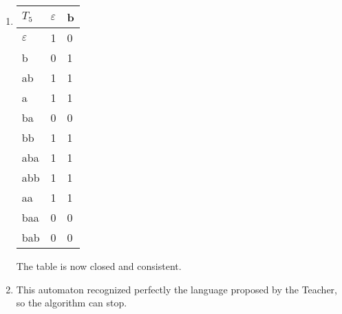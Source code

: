 \begin{enumerate}
  \item \begin{minipage}{0.3\textwidth}
          \begin{tabular}{l||l|l}
            $T_5$         & $\varepsilon$ & b \\
            \hline\hline
            $\varepsilon$ & 1             & 0 \\
            b             & 0             & 1 \\
            ab            & 1             & 1 \\
            a             & 1             & 1 \\
            ba            & 0             & 0 \\
            \hline\hline
            bb            & 1             & 1 \\
            aba           & 1             & 1 \\
            abb           & 1             & 1 \\
            aa            & 1             & 1 \\
            baa           & 0             & 0 \\
            bab           & 0             & 0 \\
          \end{tabular}
        \end{minipage} \quad
        \begin{minipage}{0.5\textwidth}
          The table is now closed and consistent.
        \end{minipage}
  \item \begin{minipage}{0.3\textwidth}
          
        \end{minipage}\quad
        \begin{minipage}{0.6\textwidth}
          This automaton recognized perfectly the language proposed by the Teacher, so the algorithm can stop.
        \end{minipage}
\end{enumerate}
